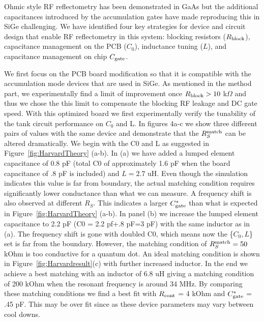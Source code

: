 \documentclass[]{article}
\begin{document}
	Ohmic style RF reflectometry has been demonstrated in GaAs but the additional capacitances introduced by the accumulation gates have made reproducing this in SiGe challenging.  We have identified four key strategies for device and circuit design that enable RF reflectometry in this system: blocking resistors ($R_{\rm block}$), capacitance management on the PCB ($C_0$), inductance tuning ($L$), and capacitance management on chip $C_{\rm gate}$.  
	
	We first focus on the PCB board modification so that it is compatible with the accumulation mode devices that are used in SiGe. As mentioned in the method part, we experimentally find a limit of improvement once $R_{\rm block}>10$ k$\Omega$ and thus we chose the this limit to compensate the blocking RF leakage and DC gate speed. With this optimized board we first experimentally verify the tunability of the tank circuit performance on $C_0$ and L. In figures 4a-c we show three different pairs of values with the same device and demonstrate that the  $R^{\rm match}_S$ can be altered dramatically. We begin with the C0 and L as suggested in Figure\ \ref{fig:HarvardTheory} (a-b). In (a) we have added a lumped element capacitance of 0.8 pF (total C0 of approximately 1.6 pF when the board capacitance of .8 pF is included) and $L = 2.7$ uH.  Even though the simulation indicates this value is far from boundary, the actual matching condition requires significantly lower conductance than what we can measure. A frequency shift is also observed at different $R_S$. This indicates a larger $C^*_{\rm gate}$ than what is expected in Figure\ \ref{fig:HarvardTheory} (a-b). In panel (b) we increase the lumped element capacitance to 2.2 pF (C0 = 2.2 pf+.8 pF=3 pF) with the same inductor as in (a). The frequency shift is gone with doubled C0, which means now the \{$C_0, L$\} set is far from the boundary. 
	However, the matching condition of  $R^{\rm match}_S = 50$ kOhm is too conductive for a quantum dot. An ideal matching condition is shown in Figure\ \ref{fig:Harvardresult}(c) with further increased inductor. In the end we achieve a best matching with an inductor of 6.8 uH giving a matching condition of 200 kOhm when the resonant frequency is around 34 MHz. By comparing these matching conditions we find a best fit with $R_{\rm cont}$ = 4 kOhm and $C^*_{\rm gate}$ = .45 pF. This may be over fit since as these device parameters may vary between cool downs. %
	
\end{document}
